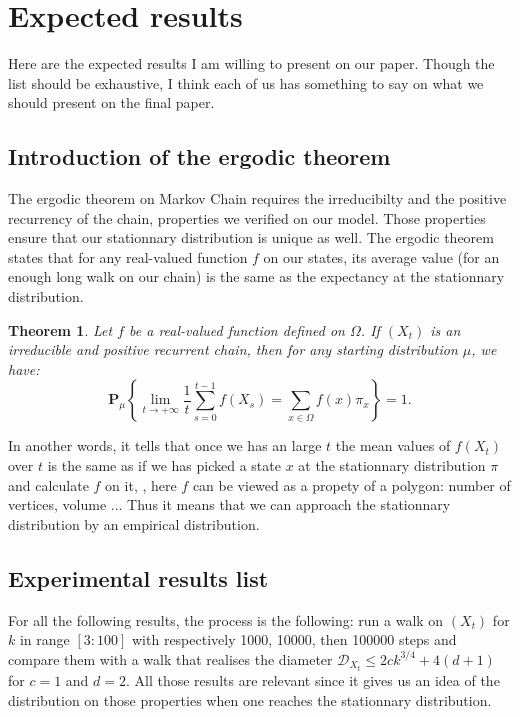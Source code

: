 \documentclass[a4paper]{article}
\newtheorem{theorem}{Theorem}
\begin{document}
\section*{Expected results}
Here are the expected results I am willing to present on our paper. Though the list should be exhaustive, I think each of us has something to say on what we should present on the final paper.

\subsection*{Introduction of the ergodic theorem}
The ergodic theorem on Markov Chain requires the irreducibilty and the positive recurrency of the chain, properties we verified on our model. Those properties ensure that our stationnary distribution is unique as well. The ergodic theorem states that for any real-valued function $f$ on our states, its average value (for an enough long walk on our chain) is the same as the expectancy at the stationnary distribution.

\begin{theorem}
  Let $f$ be a real-valued function defined on $\Omega$. If $(X_t)$ is an irreducible and positive recurrent chain, then for any starting distribution $\mu$, we have:
  $$
    \mathbf{P}_\mu \left\{ \lim_{t \rightarrow +\infty} \frac{1}{t} \sum_{s=0}^{t-1} f(X_s) = \sum_{x \in \Omega} f(x)\pi_x \right\} = 1.
  $$
\end{theorem}

In another words, it tells that once we has an large $t$ the mean values of $f(X_t)$ over $t$ is the same as if we has picked a state $x$ at the stationnary distribution $\pi$ and calculate $f$ on it, , here $f$ can be viewed as a propety of a polygon: number of vertices, volume ... Thus it means that we can approach the stationnary distribution by an empirical distribution.

\subsection*{Experimental results list}

For all the following results, the process is the following: run a walk on $(X_t)$ for $k$ in range $[3:100]$ with respectively 1000, 10000, then 100000 steps and compare them with a walk that realises the diameter $\mathcal{D}_{X_t}\leq{2ck^{3/4} + 4(d+1)}$ for $c=1$ and $d=2$. All those results are relevant since it gives us an idea of the distribution on those properties when one reaches the stationnary distribution.
\end{document}

